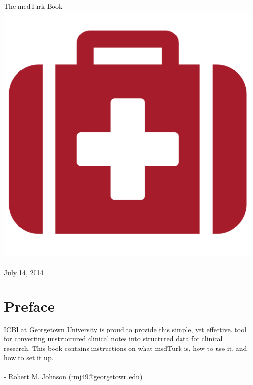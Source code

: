 \documentclass{book}
\begin{document}
\author{Robert M. Johnson \\ rmj49@georgetotwn.edu}
\date{July 2014}



\begin{titlepage}
\begin{center}

{\fontsize{50}{150}\selectfont The medTurk Book}
\includegraphics[scale=0.7]{../ui/img/medkit.png}~  \\[1cm]
July 14, 2014
\end{center}
\end{titlepage}


\frontmatter


\chapter*{Preface}
ICBI at Georgetown University is proud to provide this simple, yet effective, tool for converting unstructured clinical notes into structured data for clinical research. This book contains instructions on what medTurk is, how to use it, and how to set it up.
\\
\\
- Robert M. Johnson (rmj49@georgetown.edu)
\end{document}
